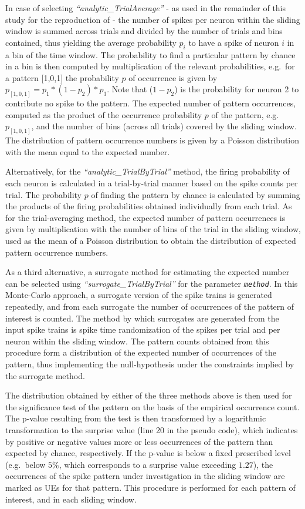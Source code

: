 \documentclass[10pt,a4paper,onecolumn]{article}
\begin{document}
In case of selecting \emph{``analytic\_TrialAverage''} - as used in the
remainder of this study for the reproduction of \autocite{Riehle97} -
the number of spikes per neuron within the sliding window is summed
across trials and divided by the number of trials and bins contained,
thus yielding the average probability \(p_{i}\) to have a spike of
neuron \(i\) in a bin of the time window. The probability to find a
particular pattern by chance in a bin is then computed by multiplication
of the relevant probabilities, e.g.~for a pattern {[}1,0,1{]} the
probability \(p\) of occurrence is given by
\(p_{[1,0,1]}=p_{1}*(1-p_{2})*p_{3}\). Note that (\(1-p_{2}\)) is the
probability for neuron 2 to contribute no spike to the pattern. The
expected number of pattern occurrences, computed as the product of the
occurrence probability \(p\) of the pattern, e.g. \(p_{[1,0,1]}\), and
the number of bins (across all trials) covered by the sliding window.
The distribution of pattern occurrence numbers is given by a Poisson
distribution with the mean equal to the expected number.

Alternatively, for the \emph{``analytic\_TrialByTrial''} method, the
firing probability of each neuron is calculated in a trial-by-trial
manner based on the spike counts per trial. The probability \(p\) of
finding the pattern by chance is calculated by summing the products of
the firing probabilities obtained individually from each trial. As for
the trial-averaging method, the expected number of pattern occurrences
is given by multiplication with the number of bins of the trial in the
sliding window, used as the mean of a Poisson distribution to obtain the
distribution of expected pattern occurrence numbers.

As a third alternative, a surrogate method for estimating the expected
number can be selected using \emph{``surrogate\_TrialByTrial''} for the
parameter \emph{\texttt{method}}. In this Monte-Carlo approach, a
surrogate version of the spike trains is generated repeatedly, and from
each surrogate the number of occurrences of the pattern of interest is
counted. The method by which surrogates are generated from the input
spike trains is spike time randomization of the spikes per trial and per
neuron within the sliding window. The pattern counts obtained from this
procedure form a distribution of the expected number of occurrences of
the pattern, thus implementing the null-hypothesis under the constraints
implied by the surrogate method.

The distribution obtained by either of the three methods above is then
used for the significance test of the pattern on the basis of the
empirical occurrence count. The p-value resulting from the test is then
transformed by a logarithmic transformation to the surprise value (line
20 in the pseudo code), which indicates by positive or negative values
more or less occurrences of the pattern than expected by chance,
respectively. If the p-value is below a fixed prescribed level
(e.g.~below \(5\%\), which corresponds to a surprise value exceeding
\(1.27\)), the occurrences of the spike pattern under investigation in
the sliding window are marked as UEs for that pattern. This procedure is
performed for each pattern of interest, and in each sliding window.
\end{document}
